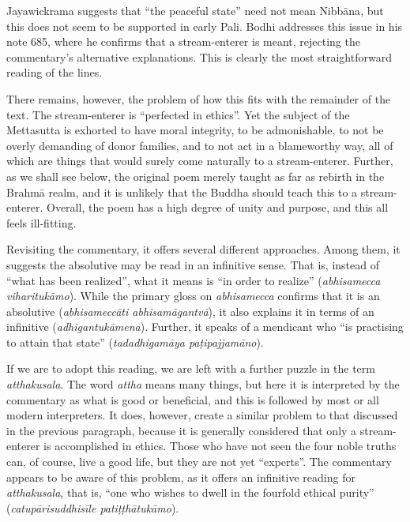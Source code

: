 \documentclass[12pt,openany]{book}%
\begin{document}
Jayawickrama suggests that “the peaceful state” need not mean \textsanskrit{Nibbāna}, but this does not seem to be supported in early Pali. Bodhi addresses this issue in his note 685, where he confirms that a stream-enterer is meant, rejecting the commentary’s alternative explanations. This is clearly the most straightforward reading of the lines.

There remains, however, the problem of how this fits with the remainder of the text. The stream-enterer is “perfected in ethics”. Yet the subject of the Mettasutta is exhorted to have moral integrity, to be admonishable, to not be overly demanding of donor families, and to not act in a blameworthy way, all of which are things that would surely come naturally to a stream-enterer. Further, as we shall see below, the original poem merely taught as far as rebirth in the \textsanskrit{Brahmā} realm, and it is unlikely that the Buddha should teach this to a stream-enterer. Overall, the poem has a high degree of unity and purpose, and this all feels ill-fitting.

Revisiting the commentary, it offers several different approaches. Among them, it suggests the absolutive may be read in an infinitive sense. That is, instead of “what has been realized”, what it means is “in order to realize” (\textit{abhisamecca \textsanskrit{viharitukāmo}}). While the primary gloss on \textit{abhisamecca} confirms that it is an absolutive (\textit{\textsanskrit{abhisameccāti} \textsanskrit{abhisamāgantvā}}), it also explains it in terms of an infinitive (\textit{\textsanskrit{adhigantukāmena}}). Further, it speaks of a mendicant who “is practising to attain that state” (\textit{\textsanskrit{tadadhigamāya} \textsanskrit{paṭipajjamāno}}).

If we are to adopt this reading, we are left with a further puzzle in the term \textit{atthakusala}. The word \textit{attha} means many things, but here it is interpreted by the commentary as what is good or beneficial, and this is followed by most or all modern interpreters. It does, however, create a similar problem to that discussed in the previous paragraph, because it is generally considered that only a stream-enterer is accomplished in ethics. Those who have not seen the four noble truths can, of course, live a good life, but they are not yet “experts”. The commentary appears to be aware of this problem, as it offers an infinitive reading for \textit{atthakusala}, that is, “one who wishes to dwell in the fourfold ethical purity” (\textit{\textsanskrit{catupārisuddhisīle} \textsanskrit{patiṭṭhātukāmo}}).
\end{document}
